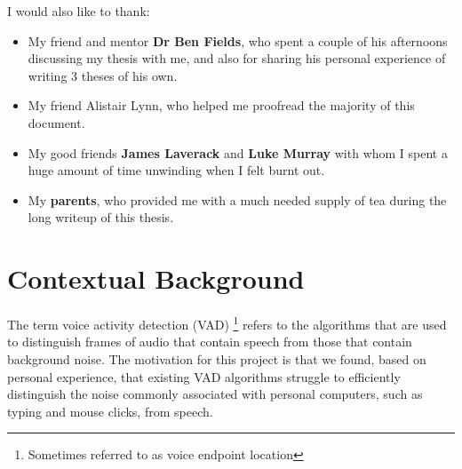 \documentclass[ %
                    author={Sam Phippen},
                supervisor={Dr. Rafal Bogacz},
                     title={Real time voice activity detectors in noisy personal computing environments},
                  subtitle={},
                    degree={MEng},
                      year={2012} ]{thesis}
\begin{document}
I would also like to thank:
\begin{itemize}

    \item My friend and mentor {\bf Dr Ben Fields}, who spent a couple of his
        afternoons discussing my thesis with me, and also for sharing his
        personal experience of writing 3 theses of his own.


    \item My friend Alistair Lynn, who helped me proofread the majority of this
        document.

    \item My good friends {\bf James Laverack} and {\bf Luke Murray} with whom
        I spent a huge amount of time unwinding when I felt burnt out.

    \item My {\bf parents}, who provided me with a much needed supply of tea
        during the long writeup of this thesis.

\end{itemize}


%

\mainmatter


\chapter{Contextual Background}
\label{chap:context}

\vspace{1cm}

The term voice activity detection (VAD) \footnote{Sometimes referred to as voice
endpoint location\cite{Tuske}} refers to the algorithms that are used to
distinguish frames of audio that contain speech from those that contain
background noise\cite{ramirez}. The motivation for this project is that we
found, based on personal experience, that existing VAD algorithms struggle to
efficiently distinguish the noise commonly associated with personal computers,
such as typing and mouse clicks, from speech.
\end{document}
